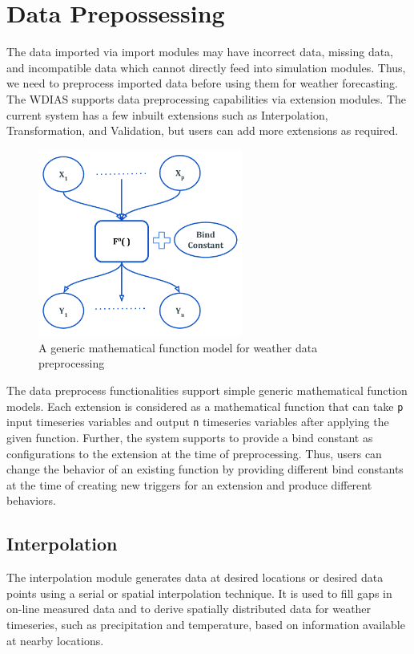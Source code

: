 \section{Data Prepossessing}
\label{se:data_preprocess}

The data imported via import modules may have incorrect data, missing data, and incompatible data which cannot directly feed into simulation modules.
Thus, we need to preprocess imported data before using them for weather forecasting. The WDIAS supports data preprocessing capabilities via extension modules. The current system has a few inbuilt extensions such as Interpolation, Transformation, and Validation, but users can add more extensions as required.

\begin{figure}[htp]
    \centering
    \includegraphics[width=0.6\textwidth]{method/data_preprocess/weather_data_preprocessing.pdf}
    \caption{A generic mathematical function model for weather data preprocessing}
    \label{fi:weather_data_preprocessing}
\end{figure}

The data preprocess functionalities support simple generic mathematical function models. Each extension is considered as a mathematical function that can take \texttt{p} input timeseries variables and output \texttt{n} timeseries variables after applying the given function. Further, the system supports to provide a bind constant as configurations to the extension at the time of preprocessing. Thus, users can change the behavior of an existing function by providing different bind constants at the time of creating new triggers for an extension and produce different behaviors.

\subsection{Interpolation}
The interpolation module generates data at desired locations or desired data points using a serial or spatial interpolation technique. It is used to fill gaps in on-line measured data and to derive spatially distributed data for weather timeseries, such as precipitation and temperature, based on information available at nearby locations.

